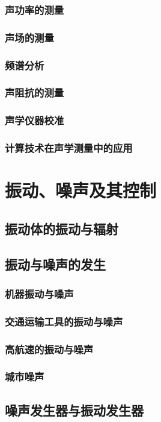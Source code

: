 \documentclass[UTF8]{../../ApplicationUniverse}
\begin{document}
    \subsubsection{声功率的测量}
    \subsubsection{声场的测量}
    \subsubsection{频谱分析}
    \subsubsection{声阻抗的测量}
    \subsubsection{声学仪器校准}
    \subsubsection{计算技术在声学测量中的应用}
\section{振动、噪声及其控制}
    \subsection{振动体的振动与辐射}
    \subsection{振动与噪声的发生}
        \subsubsection{机器振动与噪声}
        \subsubsection{交通运输工具的振动与噪声}
        \subsubsection{高航速的振动与噪声}
        \subsubsection{城市噪声}
    \subsection{噪声发生器与振动发生器}
\end{document}
